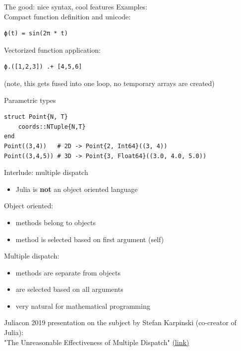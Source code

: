 \documentclass[compress,presentation,aspectratio=169]{beamer}
\begin{document}
\begin{frame}[fragile,label={sec:org8723e64}]{The good: nice syntax,
    cool features}
  \footnotesize
Examples:\\[4mm]

Compact function definition and unicode:
\begin{verbatim}
ϕ(t) = sin(2π * t)
\end{verbatim}

Vectorized function application:
\begin{verbatim}
ϕ.([1,2,3]) .+ [4,5,6]
\end{verbatim}
(note, this gets fused into one loop, no temporary arrays are created)

Parametric types
\begin{verbatim}
struct Point{N, T}
    coords::NTuple{N,T}
end
Point((3,4))   # 2D -> Point{2, Int64}((3, 4))
Point((3,4,5)) # 3D -> Point{3, Float64}((3.0, 4.0, 5.0))
\end{verbatim}


\end{frame}

\begin{frame}[label={sec:org1e274f0}]{Interlude: multiple dispatch}
  \footnotesize
\begin{itemize}
\item Julia is \textbf{not} an object oriented language
\end{itemize}

Object oriented:
\begin{itemize}
\item methods belong to objects
\item method is selected based on first argument (self)
\end{itemize}

Multiple dispatch:
\begin{itemize}
\item methods are separate from objects
\item are selected based on all arguments
\item very natural for mathematical programming
\end{itemize}

Juliacon 2019 presentation on the subject by Stefan Karpinski
(co-creator of Julia):\\
"The Unreasonable Effectiveness of Multiple Dispatch" \href{https://www.youtube.com/watch?v=kc9HwsxE1OY}{(link)}

\end{frame}
\end{document}
